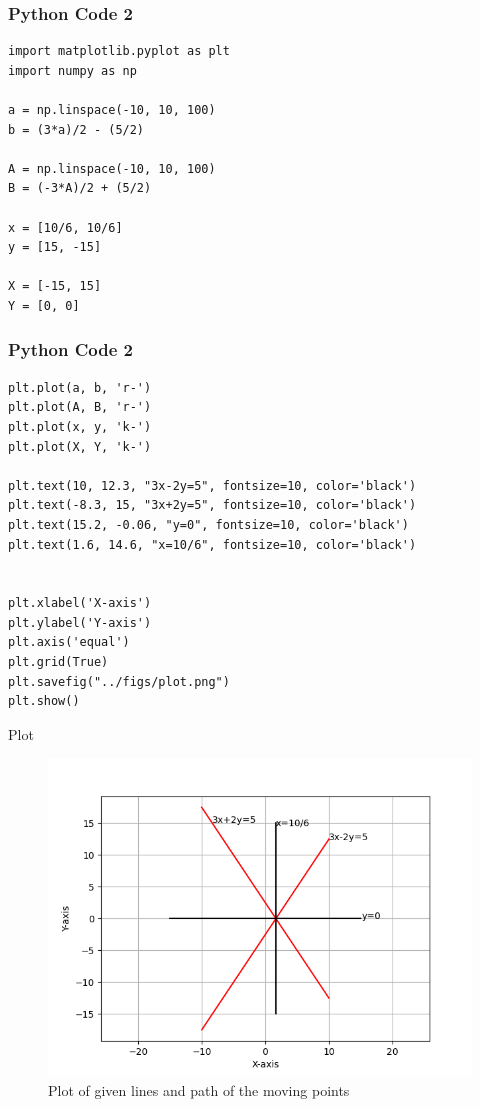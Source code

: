 \documentclass{beamer}
\begin{document}
\begin{frame}[fragile]
    \frametitle{Python Code 2}
    \begin{lstlisting}
import matplotlib.pyplot as plt
import numpy as np

a = np.linspace(-10, 10, 100)
b = (3*a)/2 - (5/2)

A = np.linspace(-10, 10, 100)
B = (-3*A)/2 + (5/2)

x = [10/6, 10/6]
y = [15, -15]

X = [-15, 15]
Y = [0, 0]
    \end{lstlisting}
\end{frame}

\begin{frame}[fragile]
    \frametitle{Python Code 2}
    \begin{lstlisting}
plt.plot(a, b, 'r-')
plt.plot(A, B, 'r-')
plt.plot(x, y, 'k-')
plt.plot(X, Y, 'k-')

plt.text(10, 12.3, "3x-2y=5", fontsize=10, color='black')
plt.text(-8.3, 15, "3x+2y=5", fontsize=10, color='black')
plt.text(15.2, -0.06, "y=0", fontsize=10, color='black')
plt.text(1.6, 14.6, "x=10/6", fontsize=10, color='black')


plt.xlabel('X-axis')
plt.ylabel('Y-axis')
plt.axis('equal')
plt.grid(True)
plt.savefig("../figs/plot.png")
plt.show()    \end{lstlisting}
\end{frame}

\begin{frame}{Plot}
    \begin{figure}
        \centering
        \includegraphics[width=0.5\columnwidth]{../figs/plot.png}
        \caption{Plot of given lines and path of the moving points}
        \label{fig:fig}
    \end{figure}
\end{frame}
\end{document}
